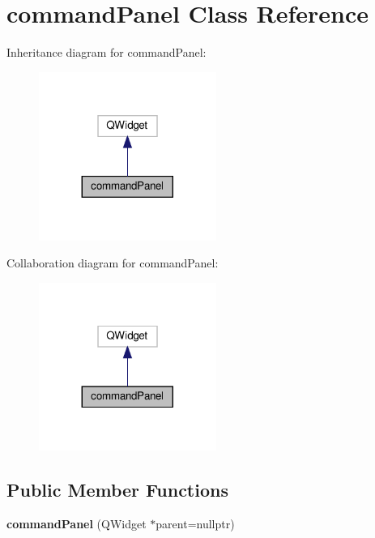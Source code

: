 \hypertarget{classcommandPanel}{}\section{command\+Panel Class Reference}
\label{classcommandPanel}


Inheritance diagram for command\+Panel\+:
\nopagebreak
\begin{figure}[H]
\begin{center}
\leavevmode
\includegraphics[width=164pt]{classcommandPanel__inherit__graph}
\end{center}
\end{figure}


Collaboration diagram for command\+Panel\+:
\nopagebreak
\begin{figure}[H]
\begin{center}
\leavevmode
\includegraphics[width=164pt]{classcommandPanel__coll__graph}
\end{center}
\end{figure}
\subsection*{Public Member Functions}
\begin{DoxyCompactItemize}
\item 
\mbox{\label{classcommandPanel_a4d5746d112c177124eddf5a5deb00e2f}} 
{\bfseries command\+Panel} (Q\+Widget $\ast$parent=nullptr)
\end{DoxyCompactItemize}
